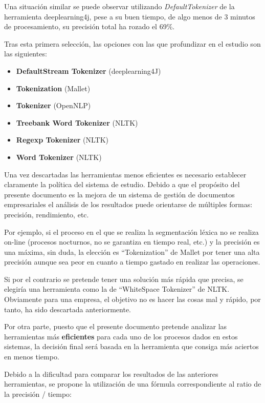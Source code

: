 \documentclass[runningheads,a4paper]{llncs}
\theoremstyle{break}
\begin{document}
Una situación similar se puede observar utilizando \textit{DefaultTokenizer} de la herramienta deeplearning4j, pese a su buen tiempo, de algo menos de 3 minutos de procesamiento, su precisión total ha rozado el 69\%. 

\newpage

Tras esta primera selección, las opciones con las que profundizar en el estudio son las siguientes: 

\begin{itemize}
  \item \textbf{DefaultStream Tokenizer} (deeplearning4J)
  \item \textbf{Tokenization} (Mallet)
  \item \textbf{Tokenizer} (OpenNLP)
  \item \textbf{Treebank Word Tokenizer} (NLTK)
  \item \textbf{Regexp Tokenizer} (NLTK)
  \item \textbf{Word Tokenizer} (NLTK)
\end{itemize}

Una vez descartadas las herramientas menos eficientes es necesario establecer claramente la política del sistema de estudio. Debido a que el propósito del presente documento es la mejora de un sistema de gestión de documentos empresariales el análisis de los resultados puede orientarse de múltiples formas: precisión, rendimiento, etc.

Por ejemplo, si el proceso en el que se realiza la segmentación léxica no se realiza on-line (procesos nocturnos, no se garantiza en tiempo real, etc.) y la precisión es una máxima, sin duda, la elección es ``Tokenization'' de Mallet por tener una alta precisión aunque sea peor en cuanto a tiempo gastado en realizar las operaciones.

Si por el contrario se pretende tener una solución más rápida que precisa, se elegiría una herramienta como la de ``WhiteSpace Tokenizer'' de NLTK. Obviamente para una empresa, el objetivo no es hacer las cosas mal y rápido, por tanto, ha sido descartada anteriormente.

Por otra parte, puesto que el presente documento pretende analizar las herramientas más \textbf{eficientes} para cada uno de los procesos dados en estos sistemas, la decisión final será basada en la herramienta que consiga más aciertos en menos tiempo.

Debido a la dificultad para comparar los resultados de las anteriores herramientas, se propone la utilización de una fórmula correspondiente al ratio de la precisión / tiempo:
\end{document}
